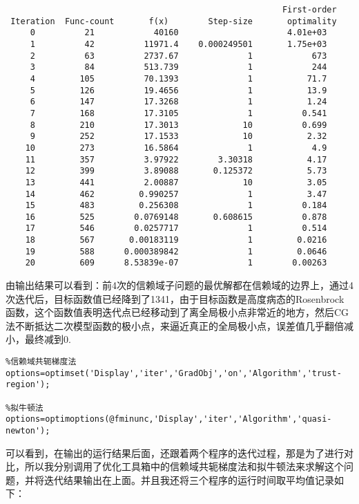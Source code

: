 \begin{lstlisting}
                                                        First-order 
 Iteration  Func-count       f(x)        Step-size       optimality
     0          21            40160                      4.01e+03
     1          42          11971.4    0.000249501       1.75e+03  
     2          63          2737.67              1            673  
     3          84          513.739              1            244  
     4         105          70.1393              1           71.7  
     5         126          19.4656              1           13.9  
     6         147          17.3268              1           1.24  
     7         168          17.3105              1          0.541  
     8         210          17.3013             10          0.699  
     9         252          17.1533             10           2.32  
    10         273          16.5864              1            4.9  
    11         357          3.97922        3.30318           4.17  
    12         399          3.89088       0.125372           5.73  
    13         441          2.00887             10           3.05  
    14         462         0.990257              1           3.47  
    15         483         0.256308              1          0.184  
    16         525        0.0769148       0.608615          0.878  
    17         546        0.0257717              1          0.514  
    18         567       0.00183119              1         0.0216  
    19         588      0.000389842              1         0.0646  
    20         609      8.53839e-07              1        0.00263  
\end{lstlisting}

由输出结果可以看到：前4次的信赖域子问题的最优解都在信赖域的边界上，通过4次迭代后，目标函数值已经降到了1341，由于目标函数是高度病态的Rosenbrock函数，这个函数值表明迭代点已经移动到了离全局极小点非常近的地方，然后CG法不断抵达二次模型函数的极小点，来逼近真正的全局极小点，误差值几乎翻倍减小，最终减到0.

\begin{lstlisting}
%信赖域共轭梯度法
options=optimset('Display','iter','GradObj','on','Algorithm','trust-region');

%拟牛顿法
options=optimoptions(@fminunc,'Display','iter','Algorithm','quasi-newton');
\end{lstlisting}

可以看到，在输出的运行结果后面，还跟着两个程序的迭代过程，那是为了进行对比，所以我分别调用了优化工具箱中的信赖域共轭梯度法和拟牛顿法来求解这个问题，并将迭代结果输出在上面。并且我还将三个程序的运行时间取平均值记录如下：

